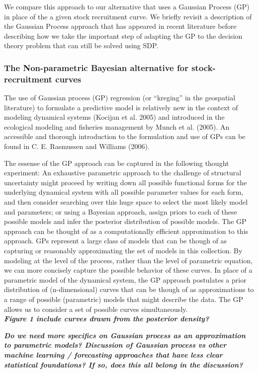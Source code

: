 \documentclass[author-year, review]{elsarticle} %
\begin{document}
We compare this approach to our alternative that uses a Gaussian Process
(GP) in place of the a given stock recruitment curve. We briefly revisit
a description of the Gaussian Process approach that has appeared in
recent literature before describing how we take the important step of
adapting the GP to the decision theory problem that can still be solved
using SDP.

\subsubsection{The Non-parametric Bayesian alternative for
stock-recruitment curves}

The use of Gaussian process (GP) regression (or ``kreging'' in the
geospatial literature) to formulate a predictive model is relatively new
in the context of modeling dynamical systems (Kocijan et al. 2005) and
introduced in the ecological modeling and fisheries management by Munch
et al. (2005). An accessible and thorough introduction to the
formulation and use of GPs can be found in C. E. Rasmussen and Williams
(2006).

The essense of the GP approach can be captured in the following thought
experiment: An exhaustive parametric approach to the challenge of
structural uncertainty might proceed by writing down all possible
functional forms for the underlying dynamical system with all possible
parameter values for each form, and then consider searching over this
huge space to select the most likely model and parameters; or using a
Bayesian approach, assign priors to each of these possible models and
infer the posterior distribution of possible models. The GP approach can
be thought of as a computationally efficient approximation to this
approach. GPs represent a large class of models that can be though of as
capturing or reasonably approximating the set of models in this
collection. By modeling at the level of the process, rather than the
level of parametric equation, we can more concisely capture the possible
behavior of these curves. In place of a parametric model of the
dynamical system, the GP approach postulates a prior distribution of
(n-dimensional) curves that can be though of as approximations to a
range of possible (parametric) models that might describe the data. The
GP allows us to consider a set of possible curves simultaneously.\\
\textbf{\emph{Figure 1 include curves drawn from the posterior
density?}}

\textbf{\emph{Do we need more specifics on Gaussian process as an
approximation to parametric models? Discussion of Gaussian process vs
other machine learning / forecasting approaches that have less clear
statistical foundations? If so, does this all belong in the
discussion?}}
\end{document}
